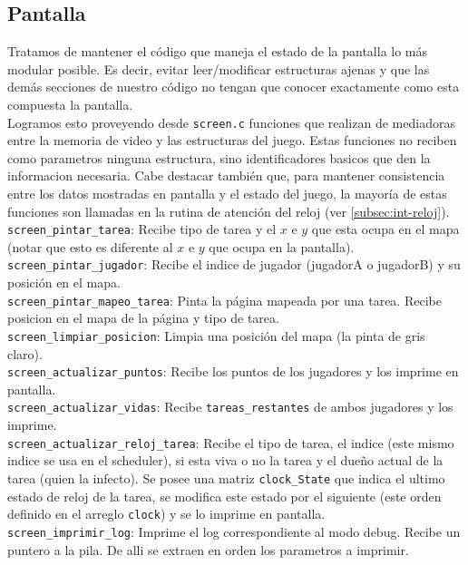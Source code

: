 \vspace{10pt}
\subsection{Pantalla}

Tratamos de mantener el código que maneja el estado de la pantalla lo más modular posible. Es decir, evitar leer/modificar estructuras ajenas  y que las demás secciones de nuestro código no tengan que conocer exactamente como esta compuesta la pantalla.\\

Logramos esto proveyendo desde  \verb|screen.c| funciones que realizan de mediadoras entre la memoria de video y las estructuras del juego. Estas funciones no reciben como parametros ninguna estructura, sino identificadores basicos que den la informacion necesaria. Cabe destacar también que, para mantener consistencia entre los datos mostradas en pantalla y el estado del juego, la mayoría de estas funciones son llamadas en la rutina de atención del reloj (ver \ref{subsec:int-reloj}).\\


\verb|screen_pintar_tarea|: Recibe tipo de tarea y el $x$ e $y$ que esta ocupa en el mapa (notar que esto es diferente al $x$ e $y$ que ocupa en la pantalla).\\

\verb|screen_pintar_jugador|: Recibe el indice de jugador (jugadorA o jugadorB) y su posición en el mapa.\\

\verb|screen_pintar_mapeo_tarea|: Pinta la página mapeada por una tarea. Recibe posicion en el mapa de la página y tipo de tarea.\\

\verb|screen_limpiar_posicion|: Limpia una posición del mapa (la pinta de gris claro).\\

\verb|screen_actualizar_puntos|: Recibe los puntos de los jugadores y los imprime en pantalla.\\

\verb|screen_actualizar_vidas|: Recibe \verb|tareas_restantes| de ambos jugadores y los imprime.\\

\verb|screen_actualizar_reloj_tarea|: Recibe el tipo de tarea, el indice (este mismo indice se usa en el scheduler), si esta viva o no la tarea y el dueño actual de la tarea (quien la infecto). Se posee una matriz \verb|clock_State| que indica el ultimo estado de reloj de la tarea, se modifica este estado por el siguiente (este orden definido en el arreglo \verb|clock|) y se lo imprime en pantalla.\\

\verb|screen_imprimir_log|: Imprime el log correspondiente al modo debug. Recibe un puntero a la pila. De alli se extraen en orden los parametros a imprimir.\\

\newpage

